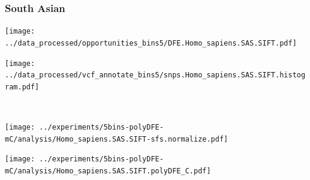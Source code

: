 \subsubsection{South Asian}

\begin{minipage}{0.49\linewidth}
    \texttt{[image: ../data\_processed/opportunities\_bins5/DFE.Homo\_sapiens.SAS.SIFT.pdf]}
\end{minipage}
\begin{minipage}{0.49\linewidth}
    \texttt{[image: ../data\_processed/vcf\_annotate\_bins5/snps.Homo\_sapiens.SAS.SIFT.histogram.pdf]}
\end{minipage}
\\
\begin{minipage}{0.49\linewidth}
    \texttt{[image: ../experiments/5bins-polyDFE-mC/analysis/Homo\_sapiens.SAS.SIFT-sfs.normalize.pdf]}
\end{minipage}
\begin{minipage}{0.4\linewidth}
    \texttt{[image: ../experiments/5bins-polyDFE-mC/analysis/Homo\_sapiens.SAS.SIFT.polyDFE\_C.pdf]}
\end{minipage}
